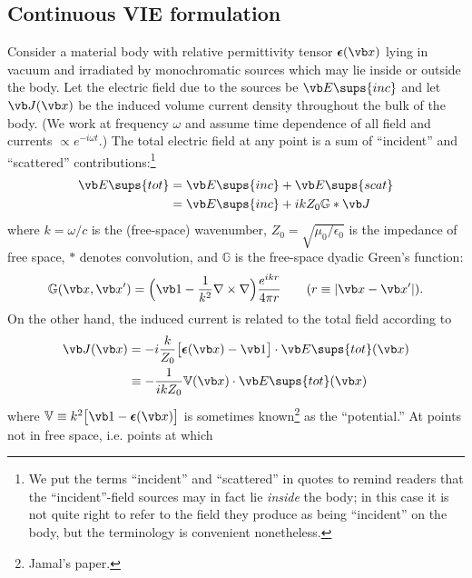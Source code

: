 \documentclass[letterpaper]{article}
\newcommand{\vbeps}{\boldsymbol{\epsilon}}
\begin{document}
\subsection*{Continuous VIE formulation}

Consider a material body with relative permittivity tensor
$\vbeps(\vb x)$ lying in vacuum and irradiated by monochromatic
sources which may lie inside or outside the body. 
Let the electric field due to the sources be $\vb E\sups{inc}$ 
and let $\vb J(\vb x)$ be the induced volume current
density throughout the bulk of the body. 
(We work at frequency $\omega$ and assume time dependence
of all field and currents $\propto e^{-i\omega t}$.)
The total electric field at any point is a sum of
``incident'' and ``scattered'' contributions:\footnote{We
put the terms ``incident'' and ``scattered'' in quotes
to remind readers that the ``incident''-field sources may
in fact lie \textit{inside} the body; in this case it is 
not quite right to refer to the field they produce as 
being ``incident'' on the body, but the terminology is 
convenient nonetheless.}
\begin{align}
 \vb E\sups{tot} &= \vb E\sups{inc} + \vb E\sups{scat}
\\
                 &= \vb E\sups{inc} + ikZ_0 \mathbb{G}*\vb J
\label{ETot}
\end{align}
where $k=\omega/c$ is the (free-space) wavenumber,
$Z_0=\sqrt{\mu_0/\epsilon_0}$ is the impedance of free space,
$*$ denotes convolution, and $\mathbb{G}$ is the free-space
dyadic Green's function:
$$ \mathbb{G}(\vb x, \vb x^\prime) = 
   \Big(\vb 1 - \frac{1}{k^2} \nabla \times \nabla \Big)
   \frac{e^{ikr}}{4\pi r}
   \qquad (r\equiv |\vb x-\vb x^\prime|).
$$
On the other hand, the induced current is related to the total field
according to
\begin{align*}
 \vb J(\vb x) 
&= -i\frac{k}{Z_0} \big[\vbeps(\vb x) - \vb 1\big]\cdot \vb E\sups{tot}(\vb x)
\\
&\equiv -\frac{1}{ikZ_0} \mathbb{V}(\vb x) \cdot \vb E\sups{tot}(\vb x)
\end{align*}
where $\mathbb{V}\equiv k^2\big[\vb 1 - \vbeps(\vb x)\big]$ is
sometimes known\footnote{Jamal's paper.} as the ``potential.''
At points not in free space, i.e. points at which 
\end{document}
